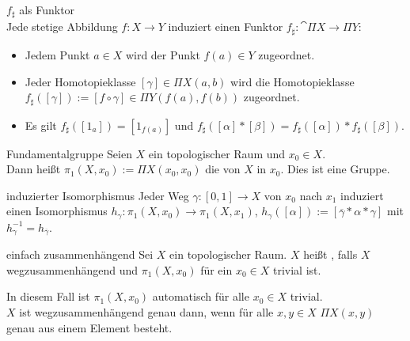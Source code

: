 \begin{Satz}{$f_\sharp$ als Funktor}\\
    Jede stetige Abbildung $f\colon X \rightarrow Y$ induziert einen Funktor
    $f_\sharp\colon \cat{\Pi X} \rightarrow \Pi Y$:
    \begin{itemize}
        \item
        Jedem Punkt $a \in X$ wird der Punkt $f(a) \in Y$ zugeordnet.
        
        \item
        Jeder Homotopieklasse $[\gamma] \in \Pi X(a, b)$ wird die
        Homotopieklasse \\
        $f_\sharp([\gamma]) := [f \circ \gamma] \in \Pi Y(f(a), f(b))$
        zugeordnet. 
        
        \item
        Es gilt $f_\sharp([1_a]) = [1_{f(a)}]$ und
        $f_\sharp([\alpha] \ast [\beta]) =
        f_\sharp([\alpha]) \ast f_\sharp([\beta])$.
    \end{itemize}
\end{Satz}

\linie

\begin{Def}{Fundamentalgruppe}
    Seien $X$ ein topologischer Raum und $x_0 \in X$. \\
    Dann heißt $\pi_1(X, x_0) := \Pi X(x_0, x_0)$
    die  von $X$ in $x_0$.
    Dies ist eine Gruppe.
\end{Def}

\begin{Satz}{induzierter Isomorphismus}
    Jeder Weg $\gamma\colon [0, 1] \rightarrow X$ von $x_0$ nach $x_1$
    induziert einen Isomorphismus
    $h_\gamma\colon \pi_1(X, x_0) \rightarrow \pi_1(X, x_1)$,
    $h_\gamma([\alpha]) := [\overline{\gamma} \ast \alpha \ast \gamma]$
    mit $h_\gamma^{-1} = h_{\overline{\gamma}}$.
\end{Satz}

\linie
\pagebreak

\begin{Def}{einfach zusammenhängend}
    Sei $X$ ein topologischer Raum.
    $X$ heißt , falls $X$ wegzusammenhängend
    und $\pi_1(X, x_0)$ für ein $x_0 \in X$ trivial ist.
\end{Def}

\begin{Bem}
    In diesem Fall ist $\pi_1(X, x_0)$ automatisch
    für alle $x_0 \in X$ trivial. \\
    $X$ ist wegzusammenhängend genau dann, wenn für alle $x, y \in X$
    $\Pi X(x, y)$ genau aus einem Element besteht.
\end{Bem}

